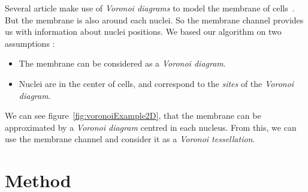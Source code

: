 Several article make use of \emph{Voronoi diagrams} to model the membrane of cells~\cite{luengo2008can,yu2010evolving}.
But the membrane is also around each nuclei. So the membrane channel provides us with information about nuclei positions.
We based our algorithm on two assumptions :
\begin{itemize}
\item The membrane can be considered as a \emph{Voronoi diagram}.
\item Nuclei are in the center of cells, and correspond to the \emph{sites} of the \emph{Voronoi diagram}.
\end{itemize}
We can see figure~\ref{fig:voronoiExample2D}, that the membrane can be approximated by a \emph{Voronoi diagram} centred in each nucleus.
From this, we can use the membrane channel and consider it as a \emph{Voronoi tessellation}.




\section{Method}

